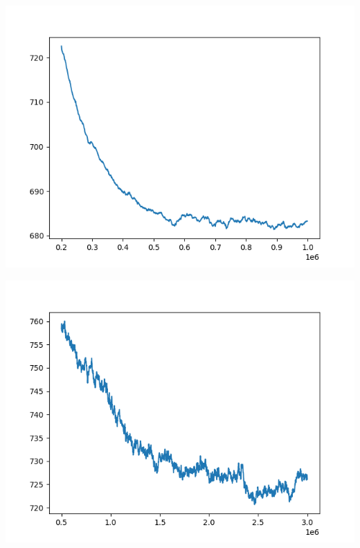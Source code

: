 \documentclass{article}
\begin{document}
\begin{enumerate}[label=\arabic*.]
        \begin{minipage}{0.49\linewidth}
            \includegraphics[width=\linewidth]{../starter_code/figs/sgd_wo_k_40.png}
            \label{nobiasreg40}
        \end{minipage}\hfill
        \begin{minipage}{0.49\linewidth}
            \includegraphics[width=\linewidth]{../starter_code/figs/sgd_k40.png}
            \label{withbiasreg40}
        \end{minipage}\hfill
        \begin{minipage}{0.49\linewidth}

\end{minipage}
\end{enumerate}
\end{document}
